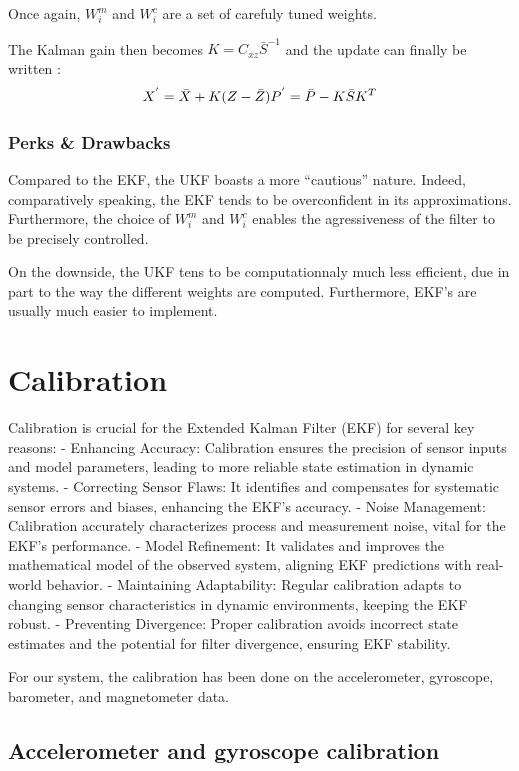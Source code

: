 \documentclass[12pt]{article}
\begin{document}
Once again, \(W_{i}^{m}\) and \(W_{i}^{c}\) are a set of carefuly tuned
weights.

The Kalman gain then becomes \(K = C_{xz}\bar{S}^{-1}\) and the update
can finally be written : \[X^{'} = \bar{X} + K (Z - \bar{Z})\\
P^{'} = \bar{P} - K \bar{S} K^{T} \]

\subsubsection{Perks \& Drawbacks}\label{perks-drawbacks}

Compared to the EKF, the UKF boasts a more ``cautious'' nature. Indeed,
comparatively speaking, the EKF tends to be overconfident in its
approximations. Furthermore, the choice of \(W_{i}^{m}\) and
\(W_{i}^{c}\) enables the agressiveness of the filter to be precisely
controlled.

On the downside, the UKF tens to be computationnaly much less efficient,
due in part to the way the different weights are computed. Furthermore,
EKF's are usually much easier to implement.

\section{Calibration}\label{calibration}

Calibration is crucial for the Extended Kalman Filter (EKF) for several
key reasons: - Enhancing Accuracy: Calibration ensures the precision of
sensor inputs and model parameters, leading to more reliable state
estimation in dynamic systems. - Correcting Sensor Flaws: It identifies
and compensates for systematic sensor errors and biases, enhancing the
EKF's accuracy. - Noise Management: Calibration accurately characterizes
process and measurement noise, vital for the EKF's performance. - Model
Refinement: It validates and improves the mathematical model of the
observed system, aligning EKF predictions with real-world behavior. -
Maintaining Adaptability: Regular calibration adapts to changing sensor
characteristics in dynamic environments, keeping the EKF robust. -
Preventing Divergence: Proper calibration avoids incorrect state
estimates and the potential for filter divergence, ensuring EKF
stability.

For our system, the calibration has been done on the accelerometer,
gyroscope, barometer, and magnetometer data.

\subsection{Accelerometer and gyroscope
calibration}\label{accelerometer-and-gyroscope-calibration}
\end{document}
